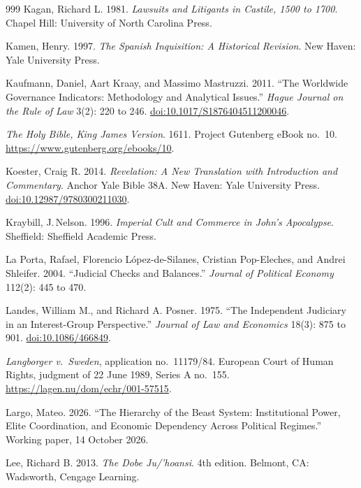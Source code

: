 \documentclass[11pt,letterpaper]{article}
\theoremstyle{definition}
\theoremstyle{remark}
\begin{document}
\begin{thebibliography}{999}
Kagan, Richard L. 1981. \emph{Lawsuits and Litigants in Castile, 1500 to 1700}. Chapel Hill: University of North Carolina Press.

Kamen, Henry. 1997. \emph{The Spanish Inquisition: A Historical Revision}. New Haven: Yale University Press.

Kaufmann, Daniel, Aart Kraay, and Massimo Mastruzzi. 2011. ``The Worldwide Governance Indicators: Methodology and Analytical Issues.'' \emph{Hague Journal on the Rule of Law} 3(2): 220 to 246. \href{https://doi.org/10.1017/S1876404511200046}{doi:10.1017/S1876404511200046}.

\emph{The Holy Bible, King James Version}. 1611. Project Gutenberg eBook no.~10. \url{https://www.gutenberg.org/ebooks/10}.

Koester, Craig R. 2014. \emph{Revelation: A New Translation with Introduction and Commentary}. Anchor Yale Bible 38A. New Haven: Yale University Press. \href{https://doi.org/10.12987/9780300211030}{doi:10.12987/9780300211030}.

Kraybill, J.\,Nelson. 1996. \emph{Imperial Cult and Commerce in John's Apocalypse}. Sheffield: Sheffield Academic Press.

La Porta, Rafael, Florencio L\'opez-de-Silanes, Cristian Pop-Eleches, and Andrei Shleifer. 2004. ``Judicial Checks and Balances.'' \emph{Journal of Political Economy} 112(2): 445 to 470.

Landes, William M., and Richard A. Posner. 1975. ``The Independent Judiciary in an Interest-Group Perspective.'' \emph{Journal of Law and Economics} 18(3): 875 to 901. \href{https://doi.org/10.1086/466849}{doi:10.1086/466849}.

\emph{Langborger v.\ Sweden}, application no.~11179/84. European Court of Human Rights, judgment of 22 June 1989, Series A no.~155. \url{https://lagen.nu/dom/echr/001-57515}.

Largo, Mateo. 2026. ``The Hierarchy of the Beast System: Institutional Power, Elite Coordination, and Economic Dependency Across Political Regimes.'' Working paper, 14 October 2026.

Lee, Richard B. 2013. \emph{The Dobe Ju/'hoansi}. 4th edition. Belmont, CA: Wadsworth, Cengage Learning.


\end{thebibliography}
\end{document}
